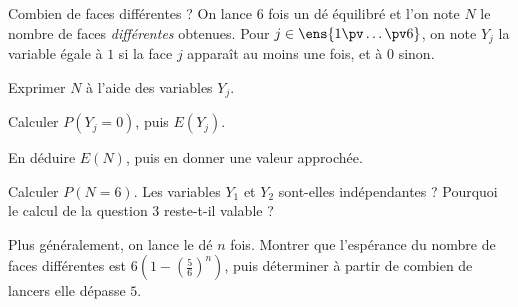 \begin{exercice}[3]{Combien de faces différentes ?}
On lance $6$ fois un dé équilibré et l'on note $N$ le nombre de faces \emph{différentes} obtenues. Pour $j\in\ens{1\pv\dots\pv6}$,
on note $Y_j$ la variable égale à $1$ si la face $j$ apparaît au moins une fois, et à $0$ sinon.
\begin{questions}
  \item Exprimer $N$ à l'aide des variables $Y_j$.
  \item Calculer $P(Y_j=0)$, puis $E(Y_j)$.
  \item En déduire $E(N)$, puis en donner une valeur approchée.
  \item Calculer $P(N=6)$. Les variables $Y_1$ et $Y_2$ sont-elles indépendantes ? Pourquoi le calcul de la question 3 reste-t-il valable ?
  \item Plus généralement, on lance le dé $n$ fois. Montrer que l'espérance du nombre de faces différentes est $6\left(1-\left(\frac56\right)^{n}\right)$,
    puis déterminer à partir de combien de lancers elle dépasse $5$.
\end{questions}
\end{exercice}
